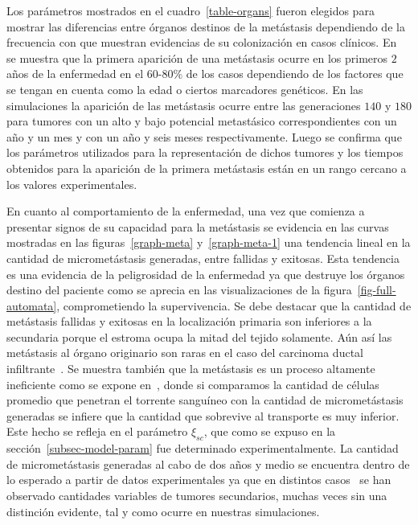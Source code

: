 Los par\'ametros mostrados en el cuadro~\ref{table-organs} fueron elegidos para mostrar las diferencias entre \'organos destinos de la met\'astasis dependiendo de la frecuencia con que muestran evidencias de su colonizaci\'on en casos cl\'inicos. En~\cite{metastasisdata} se muestra que la primera aparici\'on de una met\'astasis ocurre en los primeros $2$ a\~nos de la enfermedad en el $60$-$80\%$ de los casos dependiendo de los factores que se tengan en cuenta como la edad o ciertos marcadores gen\'eticos. En las simulaciones la aparici\'on de las met\'astasis ocurre entre las generaciones $140$ y $180$ para tumores con un alto y bajo potencial metast\'asico correspondientes con un a\~no y un mes y con un a\~no y seis meses respectivamente. Luego se confirma que los par\'ametros utilizados para la representaci\'on de dichos tumores y los tiempos obtenidos para la aparici\'on de la primera met\'astasis est\'an en un rango cercano a los valores experimentales.

En cuanto al comportamiento de la enfermedad, una vez que comienza a presentar signos de su capacidad para la met\'astasis se evidencia en las curvas mostradas en las figuras~\ref{graph-meta} y~\ref{graph-meta-1} una tendencia lineal en la cantidad de micromet\'astasis generadas, entre fallidas y exitosas. Esta tendencia es una evidencia de la peligrosidad de la enfermedad ya que destruye los \'organos destino del paciente como se aprecia en las visualizaciones de la figura~\ref{fig-full-automata}, comprometiendo la supervivencia. Se debe destacar que la cantidad de met\'astasis fallidas y exitosas en la localizaci\'on primaria son inferiores a la secundaria porque el estroma ocupa la mitad del tejido solamente. A\'un as\'i las met\'astasis al \'organo originario son raras en el caso del carcinoma ductal infiltrante~\cite{kuhn}. Se muestra tambi\'en que la met\'astasis es un proceso altamente ineficiente como se expone en~\cite{robins}, donde si comparamos la cantidad de c\'elulas promedio que penetran el torrente sangu\'ineo con la cantidad de micromet\'astasis generadas se infiere que la cantidad que sobrevive al transporte es muy inferior. Este hecho se refleja en el par\'ametro $\xi_{sc}$, que como se expuso en la secci\'on~\ref{subsec-model-param} fue determinado experimentalmente. La cantidad de micromet\'astasis generadas al cabo de dos a\~nos y medio se encuentra dentro de lo esperado a partir de datos experimentales ya que en distintos casos~\cite{nakashima,leekim,sopik} se han observado cantidades variables de tumores secundarios, muchas veces sin una distinci\'on evidente, tal y como ocurre en nuestras simulaciones. 